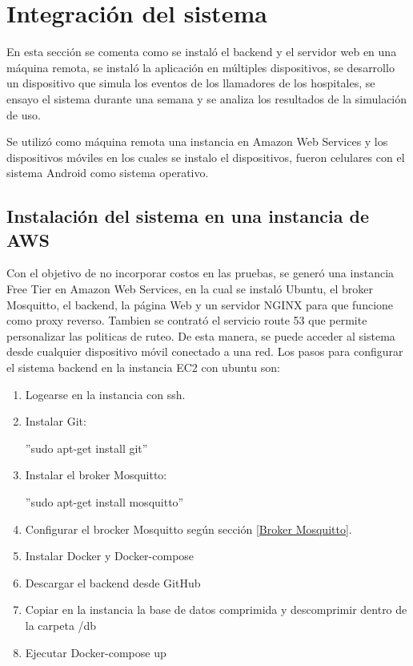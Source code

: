 \pagebreak

\section{Integración del sistema}
\label{Integración del sistema}

En esta sección se comenta como se instaló el backend y el servidor web en una máquina remota, se instaló la aplicación en múltiples dispositivos, se desarrollo un dispositivo que simula los eventos de los llamadores de los hospitales, se ensayo el sistema durante una semana y se analiza los resultados de la simulación de uso.

Se utilizó como máquina remota una instancia en Amazon Web Services y los dispositivos móviles en los cuales se instalo el dispositivos, fueron celulares con el sistema Android como sistema operativo.

\subsection{Instalación del sistema en una instancia de AWS}
Con el objetivo de no incorporar costos en las pruebas, se generó una instancia Free Tier en Amazon Web Services, en la cual se instaló Ubuntu, el broker Mosquitto, el backend, la página Web y un servidor NGINX para que funcione como proxy reverso. Tambien se contrató el servicio route 53 que permite personalizar las politicas de ruteo.
De esta manera, se puede acceder al sistema desde cualquier dispositivo móvil conectado a una red.
Los pasos para configurar el sistema backend en la instancia EC2 con ubuntu son:

\begin{enumerate}


\item Logearse en la instancia con ssh.
\item Instalar Git:

	''sudo apt-get install git''
\item Instalar el broker Mosquitto:
	
	''sudo apt-get install mosquitto''
\item Configurar el brocker Mosquitto según sección \ref{Broker Mosquitto}.
\item Instalar Docker y Docker-compose
\item Descargar el backend desde GitHub
\item Copiar en la instancia la base de datos comprimida y descomprimir dentro de la carpeta /db
\item Ejecutar Docker-compose up
\end{enumerate}

